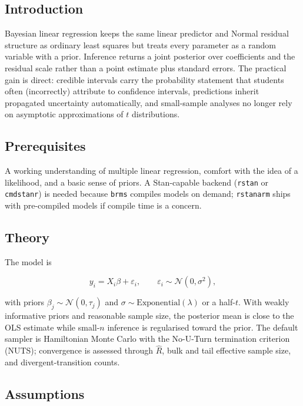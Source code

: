 \documentclass[
]{article}
\author{}
\date{\vspace{-2.5em}}
\begin{document}
\subsection{Introduction}\label{introduction}

Bayesian linear regression keeps the same linear predictor and Normal
residual structure as ordinary least squares but treats every parameter
as a random variable with a prior. Inference returns a joint posterior
over coefficients and the residual scale rather than a point estimate
plus standard errors. The practical gain is direct: credible intervals
carry the probability statement that students often (incorrectly)
attribute to confidence intervals, predictions inherit propagated
uncertainty automatically, and small-sample analyses no longer rely on
asymptotic approximations of \(t\) distributions.

\subsection{Prerequisites}\label{prerequisites}

A working understanding of multiple linear regression, comfort with the
idea of a likelihood, and a basic sense of priors. A Stan-capable
backend (\texttt{rstan} or \texttt{cmdstanr}) is needed because
\texttt{brms} compiles models on demand; \texttt{rstanarm} ships with
pre-compiled models if compile time is a concern.

\subsection{Theory}\label{theory}

The model is

\[y_i = X_i \beta + \varepsilon_i, \qquad \varepsilon_i \sim \mathcal N(0, \sigma^2),\]

with priors \(\beta_j \sim \mathcal N(0, \tau_j)\) and
\(\sigma \sim \mathrm{Exponential}(\lambda)\) or a half-\(t\). With
weakly informative priors and reasonable sample size, the posterior mean
is close to the OLS estimate while small-\(n\) inference is regularised
toward the prior. The default sampler is Hamiltonian Monte Carlo with
the No-U-Turn termination criterion (NUTS); convergence is assessed
through \(\hat R\), bulk and tail effective sample size, and
divergent-transition counts.

\subsection{Assumptions}\label{assumptions}
\end{document}
